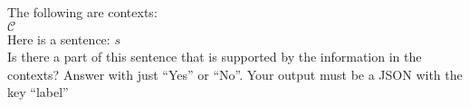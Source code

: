 \begin{prompt}[title={Prompt \thetcbcounter: GPT Entailment Prompt (\cref{subsection:citation_comp})}, label=prompt:cite_acc]
The following are contexts:\\
$\mathcal{C}$ \\
Here is a sentence: $s$\\
Is there a part of this sentence that is supported by the information in the contexts? Answer with just ``Yes'' or ``No''. Your output must be a JSON with the key ``label''
\end{prompt}
